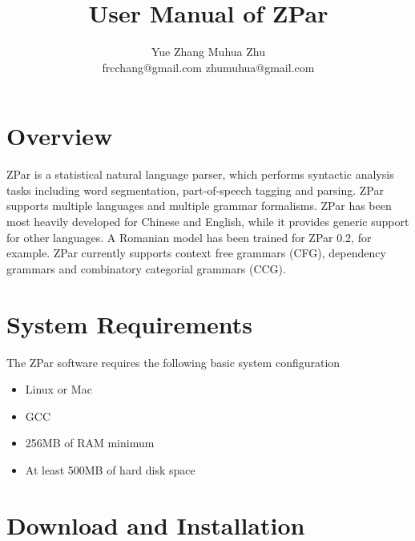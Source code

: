\documentclass[12pt]{article}
\title{User Manual of ZPar}
\author{Yue Zhang \hspace{1.5cm} Muhua Zhu \\
frcchang@gmail.com \hspace{0.5cm} zhumuhua@gmail.com
}
\begin{document}
\maketitle

\section{Overview}

ZPar is a statistical natural language parser, which performs syntactic analysis tasks including word segmentation, part-of-speech tagging and parsing. ZPar supports multiple languages and multiple grammar formalisms. ZPar has been most heavily developed for Chinese and English, while it provides generic support for other languages. A Romanian model has been trained for ZPar 0.2, for example. ZPar currently supports context free grammars (CFG), dependency grammars and combinatory categorial grammars (CCG).


\section{System Requirements}
The ZPar software requires the following basic system configuration
\begin{itemize}
\item Linux or Mac
\item GCC
\item 256MB of RAM minimum
\item At least 500MB of hard disk space
\end{itemize}

\section{Download and Installation}
\end{document}
